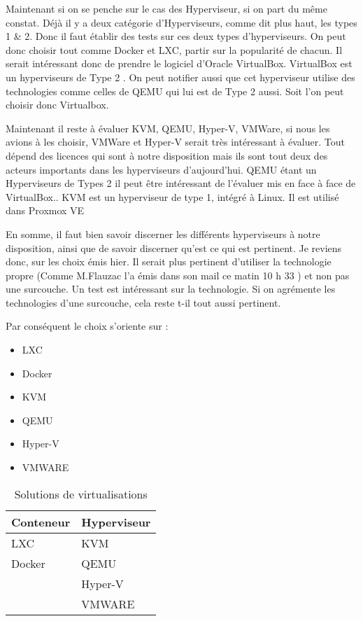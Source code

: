 Maintenant si on se penche sur le cas des Hyperviseur, si on part du même constat. Déjà il y a deux catégorie d'Hyperviseurs, comme dit plus haut, les types 1 \& 2. 
Donc il faut établir des tests sur ces deux types d'hyperviseurs. On peut donc choisir tout comme Docker et LXC, partir sur la popularité de chacun. Il serait intéressant donc de prendre le logiciel d'Oracle VirtualBox. VirtualBox est un hyperviseurs de Type 2 . On peut notifier aussi que cet hyperviseur utilise des technologies comme celles de QEMU qui lui est de Type 2 aussi. Soit l'on peut choisir donc Virtualbox.

Maintenant il reste à évaluer KVM, QEMU, Hyper-V, VMWare, si nous les avions à les choisir, VMWare et Hyper-V serait très intéressant à évaluer. Tout dépend des licences qui sont à notre disposition mais ils sont tout deux des acteurs importants dans les hyperviseurs d'aujourd'hui. QEMU étant un Hyperviseurs de Types 2 il peut être intéressant de l'évaluer mis en face à face de VirtualBox.. KVM est un hyperviseur de type 1, intégré à Linux. Il est utilisé dans Proxmox VE

En somme, il faut bien savoir discerner les différents hyperviseurs à notre disposition, ainsi que de savoir discerner qu'est ce qui est pertinent. Je reviens donc, sur les choix émis hier. Il serait plus pertinent d'utiliser la technologie propre (Comme M.Flauzac l'a émis dans son mail ce matin 10 h 33 ) et non pas une surcouche. Un test est intéressant sur la technologie. Si on agrémente les technologies d'une surcouche, cela reste t-il tout aussi pertinent. 

Par conséquent le choix s'oriente sur :
\begin{itemize}
\item LXC
\item Docker
\item KVM
\item QEMU
\item Hyper-V
\item VMWARE 
\end{itemize}
\begin{table}[h]
\centering
\caption{Solutions de virtualisations}
\label{Solution de virtualisations}
\begin{tabular}{|l|l|}
\hline
Conteneur & Hyperviseur \\ \hline
LXC       & KVM         \\
Docker    & QEMU        \\
          & Hyper-V     \\
          & VMWARE      \\ \hline
\end{tabular}
\end{table}
\newpage

